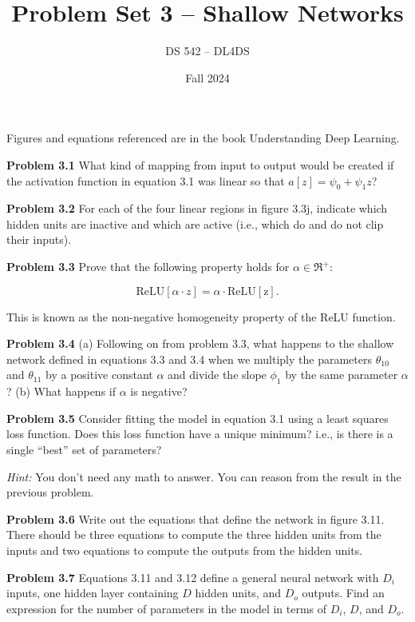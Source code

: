\documentclass[11pt, oneside]{article}   	%
\title{Problem Set 3 -- Shallow Networks}
\author{DS 542 -- DL4DS}
\date{Fall 2024}
\begin{document}
\maketitle

Figures and equations referenced are in the book Understanding Deep Learning.

\textbf{Problem 3.1} 
What kind of mapping from input to output would be created if the activation
function in equation 3.1 was linear so that \(a[z] = \psi_0 + \psi_1 z\)?

\vspace{1cm}

\textbf{Problem 3.2} For each of the four linear regions in figure 3.3j, 
indicate which hidden units are inactive and which are active (i.e., which do
and do not clip their inputs).

\vspace{1cm}

\textbf{Problem 3.3} Prove that the following property holds for
\(\alpha \in \Re^+\):

\[\mathrm{ReLU}[\alpha \cdot z] = \alpha \cdot \mathrm{ReLU[z]}.\]

This is known as the non-negative homogeneity property of the ReLU function.

\vspace{1cm}

\textbf{Problem 3.4} (a) Following on from problem 3.3, what happens to the
shallow network defined in equations 3.3 and 3.4 when we multiply the
parameters \(\theta_{10}\) and \(\theta_{11}\) by a positive constant
\(\alpha\) and divide the slope \(\phi_1\) by the same parameter
\(\alpha\)? (b) What happens if \(\alpha\) is negative?

\vspace{1cm}

\textbf{Problem 3.5} Consider fitting the model in equation 3.1 using a
least squares loss function. Does this loss function have a unique minimum?
i.e., is there is a single “best” set of parameters?

\textit{Hint:} You don't need any math to answer. You can reason from the 
result in the previous problem.

\vspace{1cm}

\textbf{Problem 3.6} Write out the equations that define the network in
figure 3.11. There should be three equations to compute the three hidden
units from the inputs and two equations to compute the outputs from the
hidden units.

\vspace{1cm}

\textbf{Problem 3.7} Equations 3.11 and 3.12 define a general neural network
with \(D_i\) inputs, one hidden layer containing \(D\) hidden units, and
\(D_o\) outputs. Find an expression for the number of parameters in the
model in terms of \(D_i\), \(D\), and \(D_o\).

\vspace{1cm}
\end{document}
